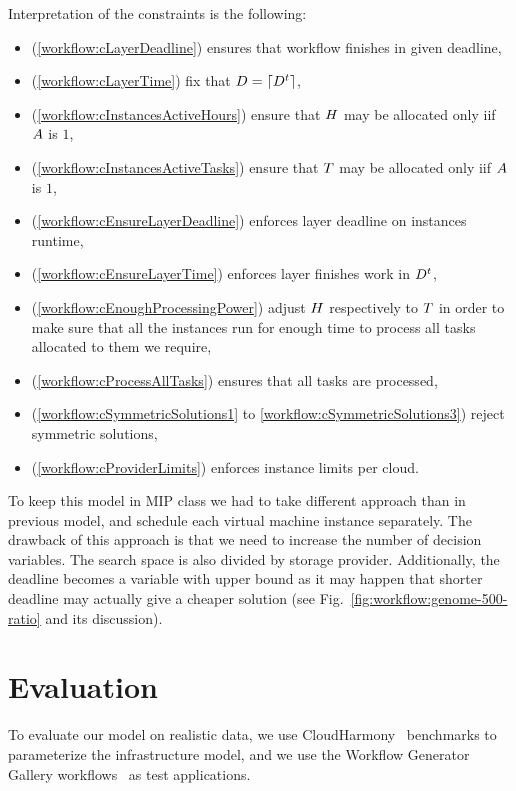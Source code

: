 {    Interpretation of the constraints is the following:
    \begin{itemize}
        \item(\ref{workflow:cLayerDeadline}) ensures that workflow finishes in given deadline,
        \item(\ref{workflow:cLayerTime}) fix that $D = \lceil D^t\rceil$,
        \item(\ref{workflow:cInstancesActiveHours}) ensure that $H$ may be allocated only iif $A$ is $1$,
        \item(\ref{workflow:cInstancesActiveTasks}) ensure that $T$ may be allocated only iif $A$ is $1$,
        \item(\ref{workflow:cEnsureLayerDeadline}) enforces layer deadline on instances runtime,
        \item(\ref{workflow:cEnsureLayerTime}) enforces layer finishes work in $D^t$,
        \item(\ref{workflow:cEnoughProcessingPower}) adjust $H$ respectively to $T$ in order to make sure that all the instances run for enough time to process all tasks allocated to them we require,
        \item(\ref{workflow:cProcessAllTasks}) ensures that all tasks are processed,
        \item(\ref{workflow:cSymmetricSolutions1} to \ref{workflow:cSymmetricSolutions3}) reject symmetric solutions,
        \item(\ref{workflow:cProviderLimits}) enforces instance limits per cloud.
    \end{itemize}
    
    To keep this model in MIP class we had to take different approach than in previous model, and schedule each virtual machine instance separately. The drawback of this approach is that we need to increase the number of decision variables. The search space is also divided by storage provider. Additionally, the deadline becomes a variable with upper bound as it may happen that shorter deadline may actually give a cheaper solution (see Fig.~\ref{fig:workflow:genome-500-ratio} and its discussion).
    
    
    \section{Evaluation}
    \label{sec:workflow:evaluation}

    To evaluate our model on realistic data, we use CloudHarmony~\cite{CloudHarmony} benchmarks to parameterize the infrastructure model, and we use the Workflow  Generator Gallery workflows~\cite{Bharathi08} as test applications.

}
